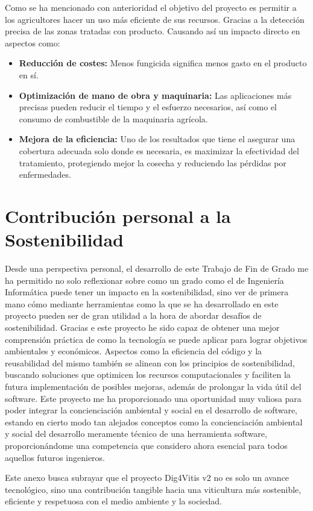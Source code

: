 Como se ha mencionado con anterioridad el objetivo del proyecto es permitir a los agricultores hacer un uso más eficiente de sus recursos. Gracias a la detección precisa de las zonas tratadas con producto.
Causando así un impacto directo en aspectos como:
\begin{itemize}
    \item \textbf{Reducción de costes:} Menos fungicida significa menos gasto en el producto en sí.
    \item \textbf{Optimización de mano de obra y maquinaria:} Las aplicaciones más precisas pueden reducir el tiempo y el esfuerzo necesarios, así como el consumo de combustible de la maquinaria agrícola.
    \item \textbf{Mejora de la eficiencia:} Uno de los resultados que tiene el asegurar una cobertura adecuada solo donde es necesaria, es maximizar la efectividad del tratamiento, protegiendo mejor la cosecha y reduciendo las pérdidas por enfermedades.
\end{itemize}

\section{Contribución personal a la Sostenibilidad}

Desde una perspectiva personal, el desarrollo de este Trabajo de Fin de Grado me ha permitido no solo reflexionar sobre como un grado como el de Ingeniería Informática puede tener un impacto en la sostenibilidad, sino ver de primera mano cómo mediante herramientas como la que se ha desarrollado en este proyecto pueden ser de gran utilidad a la hora de abordar desafíos de sostenibilidad. Gracias e este proyecto he sido capaz de obtener una mejor comprensión práctica de como la tecnología se puede aplicar para lograr objetivos ambientales y económicos.
Aspectos como la eficiencia del código y la reusabilidad del mismo también se alinean con los principios de sostenibilidad, buscando soluciones que optimicen los recursos computacionales y faciliten la futura implementación de posibles mejoras, además de prolongar la vida útil del software. 
Este proyecto me ha proporcionado una oportunidad muy valiosa para poder integrar la concienciación ambiental y social en el desarrollo de software, estando en cierto modo tan alejados conceptos como la concienciación ambiental y social del desarrollo meramente técnico de una herramienta software, proporcionándome una competencia que considero ahora esencial para todos aquellos futuros ingenieros.

Este anexo busca subrayar que el proyecto Dig4Vitis v2 no es solo un avance tecnológico, sino una contribución tangible hacia una viticultura más sostenible, eficiente y respetuosa con el medio ambiente y la sociedad.